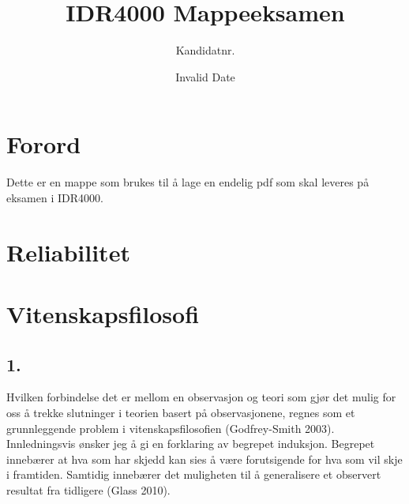 \documentclass[
  letterpaper,
  DIV=11,
  numbers=noendperiod]{scrreprt}
\title{IDR4000 Mappeeksamen}
\author{Kandidatnr.}
\date{Invalid Date}
\renewcommand*\contentsname{Table of contents}
\newcommand\contentsname{Table of contents}
\begin{document}
\maketitle
\ifdefined\Shaded\renewenvironment{Shaded}{\begin{tcolorbox}[boxrule=0pt, enhanced, frame hidden, sharp corners, borderline west={3pt}{0pt}{shadecolor}, interior hidden, breakable]}{\end{tcolorbox}}\fi

\renewcommand*\contentsname{Innholdsfortegnelse}
{
\hypersetup{linkcolor=}
\setcounter{tocdepth}{2}
\tableofcontents
}

\hypertarget{forord}{%
\chapter*{Forord}\label{forord}}


Dette er en mappe som brukes til å lage en endelig pdf som skal leveres
på eksamen i IDR4000.


\hypertarget{reliabilitet}{%
\chapter{Reliabilitet}\label{reliabilitet}}


\hypertarget{vitenskapsfilosofi}{%
\chapter{Vitenskapsfilosofi}\label{vitenskapsfilosofi}}

\hypertarget{section}{%
\section{1.}\label{section}}

Hvilken forbindelse det er mellom en observasjon og teori som gjør det
mulig for oss å trekke slutninger i teorien basert på observasjonene,
regnes som et grunnleggende problem i vitenskapsfilosofien
(Godfrey-Smith 2003). Innledningsvis ønsker jeg å gi en forklaring av
begrepet induksjon. Begrepet innebærer at hva som har skjedd kan sies å
være forutsigende for hva som vil skje i framtiden. Samtidig innebærer
det muligheten til å generalisere et observert resultat fra tidligere
(Glass 2010).
\end{document}

